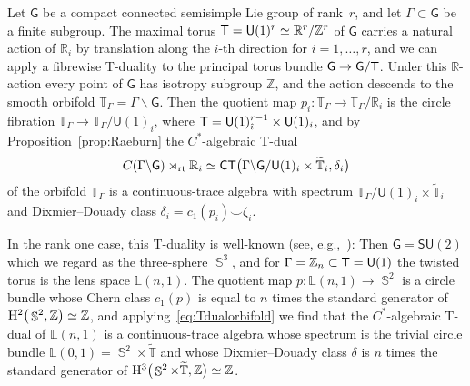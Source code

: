 \documentclass[10pt,a4paper]{amsart}
\numberwithin{equation}{section}
\DeclareMathOperator{\Sphere}{\mathbb{S}}
\newcommand{\C}{\complex}
\def\T{{\sf T}}
\def\C{{\sf C}}
\newcommand{\sfG}{\mathsf{G}}
\newcommand{\sfU}{\mathsf{U}}
\newcommand{\sfSU}{\mathsf{SU}}
\newcommand{\rt}{{\rm rt}}
\newcommand{\complex}{{\mathbb C}} %
\newcommand{\zed}{{\mathbb Z}} %
\newcommand{\real}{{\mathbb R}} %
\newcommand{\torus}{{\mathbb T}} %
\begin{document}
Let $\sfG$ be a compact connected semisimple Lie group of rank~$r$,
and let $\Gamma\subset\sfG$ be a finite subgroup. The maximal torus
$\T = \sfU(1)^r \simeq \real^r/\zed^r$ of $\sfG$ carries a natural action of
$\real_i$ by translation along the $i$-th direction for $i=1,\dots,r$,
and we can apply a fibrewise T-duality to
the principal torus bundle $\sfG\to\sfG/\T$. Under this $\real$-action
every point of $\sfG$ has
isotropy subgroup $\zed$, and the action descends to the smooth orbifold
$\torus_\Gamma=\Gamma\backslash\sfG$. Then the quotient map
$p_i\colon \torus_\Gamma\to\torus_\Gamma/\real_i$ is the circle fibration
$\torus_\Gamma\to\torus_\Gamma/\sfU(1)_i$, where
$\T=\sfU(1)^{r-1}_{\hat\imath}\times \sfU(1)_i$, and by
Proposition~\ref{prop:Raeburn} the $C^*$-algebraic T-dual
\begin{gather}\label{eq:Tdualorbifold}
C(\Gamma\backslash\sfG)\rtimes_\rt \real_i \simeq
\C\T\big(\Gamma\backslash\sfG/\sfU(1)_i\times \widetilde\torus_i,\delta_i \big)
\end{gather}
of the orbifold $\torus_\Gamma$ is a continuous-trace algebra with
spectrum $\torus_\Gamma/\sfU(1)_i\times\widetilde\torus_i$ and Dixmier--Douady
class $\delta_i=c_1(p_i)\smile\zeta_i$.

In the rank one case, this T-duality is well-known (see, e.g.,~\cite{Bouwknegt2003}): Then
$\sfG=\sfSU(2)$ which we regard as the three-sphere $\Sphere^3$, and
for $\Gamma=\zed_n\subset\T=\sfU(1)$ the twisted torus is the lens
space $\mathbb{L}(n,1)$. The quotient map $p\colon \mathbb{L}(n,1)\to
\Sphere^2$ is a circle bundle whose Chern class $c_1(p)$ is equal to
$n$ times the standard generator of ${\rm H}^2\big(\Sphere^2,\zed\big)\simeq\zed$, and applying~\eqref{eq:Tdualorbifold} we
find that the
$C^*$-algebraic T-dual of $\mathbb{L}(n,1)$ is a continuous-trace
algebra whose spectrum is the trivial circle bundle
$\mathbb{L}(0,1)=\Sphere^2\times\widetilde\torus$ and whose Dixmier--Douady class $\delta$ is
$n$ times the standard generator of ${\rm
 H}^3\big(\Sphere^2\times\widetilde{\torus},\zed\big)\simeq \zed$.
\end{document}

